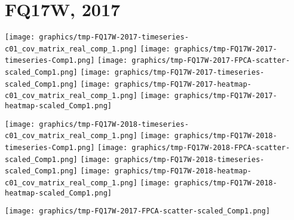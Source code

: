 
\section{FQ17W, 2017}
\setcounter{theorem}{0}

\renewcommand{\theenumi}{\roman{enumi}}
\renewcommand{\labelenumi}{\textnormal{(\theenumi)}$\;\;$}


\begin{center}
\begin{minipage}{7.0in}
\texttt{[image: graphics/tmp-FQ17W-2017-timeseries-c01\_cov\_matrix\_real\_comp\_1.png]}
\quad
\texttt{[image: graphics/tmp-FQ17W-2017-timeseries-Comp1.png]}
\vskip 0.5cm
\texttt{[image: graphics/tmp-FQ17W-2017-FPCA-scatter-scaled\_Comp1.png]}
\quad
\texttt{[image: graphics/tmp-FQ17W-2017-timeseries-scaled\_Comp1.png]}
\vskip 0.5cm
\texttt{[image: graphics/tmp-FQ17W-2017-heatmap-c01\_cov\_matrix\_real\_comp\_1.png]}
\quad
\texttt{[image: graphics/tmp-FQ17W-2017-heatmap-scaled\_Comp1.png]}
\end{minipage}
\end{center}


\begin{center}
\begin{minipage}{7.0in}
\texttt{[image: graphics/tmp-FQ17W-2018-timeseries-c01\_cov\_matrix\_real\_comp\_1.png]}
\quad
\texttt{[image: graphics/tmp-FQ17W-2018-timeseries-Comp1.png]}
\vskip 0.5cm
\texttt{[image: graphics/tmp-FQ17W-2018-FPCA-scatter-scaled\_Comp1.png]}
\quad
\texttt{[image: graphics/tmp-FQ17W-2018-timeseries-scaled\_Comp1.png]}
\vskip 0.5cm
\texttt{[image: graphics/tmp-FQ17W-2018-heatmap-c01\_cov\_matrix\_real\_comp\_1.png]}
\quad
\texttt{[image: graphics/tmp-FQ17W-2018-heatmap-scaled\_Comp1.png]}
\end{minipage}
\end{center}


\begin{center}
\texttt{[image: graphics/tmp-FQ17W-2017-FPCA-scatter-scaled\_Comp1.png]}
\end{center}

